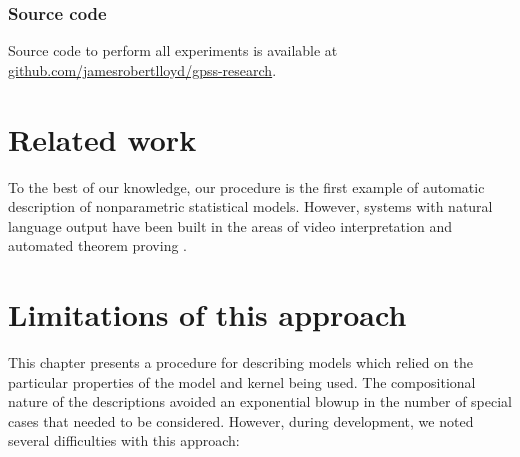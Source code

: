 \subsubsection{Source code}
Source code to perform all experiments is available at \url{github.com/jamesrobertlloyd/gpss-research}. 


\section{Related work}
\label{sec:description-related-work}


To the best of our knowledge, our procedure is the first example of automatic description of nonparametric statistical models.
However, systems with natural language output have been built in the areas of video interpretation \citep{barbu2012video} and automated theorem proving \citep{ganesalingam2013fully}.




\section{Limitations of this approach}

This chapter presents a procedure for describing \gp{} models which relied on the particular properties of the model and kernel being used.
The compositional nature of the descriptions avoided an exponential blowup in the number of special cases that needed to be considered.
However, during development, we noted several difficulties with this approach:

